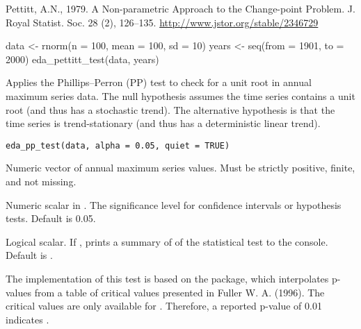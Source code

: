 \documentclass[a4paper]{book}
\begin{document}
%
\begin{References}
Pettitt, A.N., 1979. A Non-parametric Approach to the Change-point Problem. J.
Royal Statist. Soc. 28 (2), 126–135. \url{http://www.jstor.org/stable/2346729}
\end{References}
%
\begin{SeeAlso}
\end{SeeAlso}
%
\begin{Examples}
\begin{ExampleCode}
data <- rnorm(n = 100, mean = 100, sd = 10)
years <- seq(from = 1901, to = 2000)
eda_pettitt_test(data, years)

\end{ExampleCode}
\end{Examples}
%
\begin{Description}
Applies the Phillips–Perron (PP) test to check for a unit root in annual
maximum series data. The null hypothesis assumes the time series contains a
unit root (and thus has a stochastic trend). The alternative hypothesis is that
the time series is trend-stationary (and thus has a deterministic linear trend).
\end{Description}
%
\begin{Usage}
\begin{verbatim}
eda_pp_test(data, alpha = 0.05, quiet = TRUE)
\end{verbatim}
\end{Usage}
%
\begin{Arguments}
\begin{ldescription}
\item[\code{data}] Numeric vector of annual maximum series values.
Must be strictly positive, finite, and not missing.

\item[\code{alpha}] Numeric scalar in \eqn{[0.01, 0.1]}{}. The significance
level for confidence intervals or hypothesis tests. Default is 0.05.

\item[\code{quiet}] Logical scalar. If , prints a summary of of the statistical
test to the console. Default is .
\end{ldescription}
\end{Arguments}
%
\begin{Details}
The implementation of this test is based on the  package, which
interpolates p-values from a table of critical values presented in Fuller W. A.
(1996). The critical values are only available for .
Therefore, a reported p-value of 0.01 indicates .
\end{Details}
\end{document}

